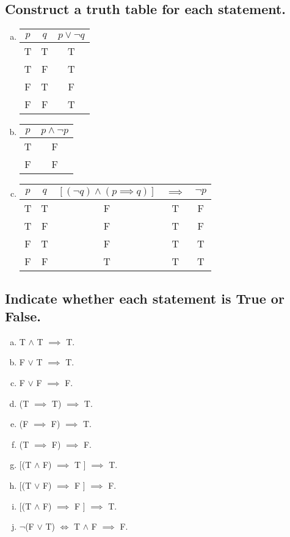 \documentclass[12pt]{scrartcl} %
\begin{document}
\subsection{Construct a truth table for each statement.}
\begin{enumerate}[(a)]
	\item
		\begin{tabular}{*{2}{c}|*{1}{c}}$p$&$q$&$p \lor \neg q$\\
		\hline
		T&T&T\\
		T&F&T\\
		F&T&F\\
		F&F&T\\
		\end{tabular}
	\item
		\begin{tabular}{*{1}{c}|*{1}{c}}$p$&$p \land \neg p$\\
		\hline
		T&F\\
		F&F\\
		\end{tabular}
	\item
		\begin{tabular}{*{2}{c}|*{3}{c}}$p$&$q$&$[(\neg q) \land (p \implies q)]$&$\implies$&$\neg p$\\
		\hline
		T&T&F&T&F\\
		T&F&F&T&F\\
		F&T&F&T&T\\
		F&F&T&T&T\\
		\end{tabular}
\end{enumerate}
\subsection{Indicate whether each statement is True or False.}
\begin{enumerate}[(a)]
	\item T $\land$ T $\implies$ T.
	\item F $\lor$ T $\implies$ T.
	\item F $\lor$ F $\implies$ F.
	\item (T $\implies$ T) $\implies$ T.
	\item (F $\implies$ F) $\implies$ T.
	\item (T $\implies$ F) $\implies$ F.
	\item {[}(T $\land$ F) $\implies$ T {]} $\implies$ T.
	\item {[}(T $\lor$ F) $\implies$ F {]} $\implies$ F.
	\item {[}(T $\land$ F) $\implies$ F {]} $\implies$ T.
	\item $\neg$(F $\lor$ T) $\iff$ T $\land$ F $\implies$ F.
	
\end{enumerate}
\end{document}
